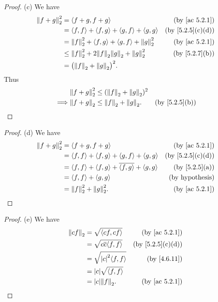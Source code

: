 \begin{proof}{(c)}
  We have
  \begin{align*}
    \norm*{f + g}_2^2 & = \inner*{f + g, f + g}                                         & \text{(by \cref{ac 5.2.1})}    \\
                      & = \inner*{f, f} + \inner*{f, g} + \inner*{g, f} + \inner*{g, g} & \text{(by \cref{5.2.5}(c)(d))} \\
                      & = \norm*{f}_2^2 + \inner*{f, g} + \inner*{g, f} + \norm*{g}_2^2 & \text{(by \cref{ac 5.2.1})}    \\
                      & \leq \norm*{f}_2^2 + 2 \norm*{f}_2 \norm*{g}_2 + \norm*{g}_2^2  & \text{(by \cref{5.2.7}(b))}    \\
                      & = \big(\norm*{f}_2 + \norm*{g}_2\big)^2.
  \end{align*}
  Thus
  \begin{align*}
             & \norm*{f + g}_2^2 \leq (\norm*{f}_2 + \norm*{g}_2)^2                               \\
    \implies & \norm*{f + g}_2 \leq \norm*{f}_2 + \norm*{g}_2.      & \text{(by \cref{5.2.5}(b))}
  \end{align*}
\end{proof}

\begin{proof}{(d)}
  We have
  \begin{align*}
    \norm*{f + g}_2^2 & = \inner*{f + g, f + g}                                                    & \text{(by \cref{ac 5.2.1})}    \\
                      & = \inner*{f, f} + \inner*{f, g} + \inner*{g, f} + \inner*{g, g}            & \text{(by \cref{5.2.5}(c)(d))} \\
                      & = \inner*{f, f} + \inner*{f, g} + \overline{\inner*{f, g}} + \inner*{g, g} & \text{(by \cref{5.2.5}(a))}    \\
                      & = \inner*{f, f} + \inner*{g, g}                                            & \text{(by hypothesis)}         \\
                      & = \norm*{f}_2^2 + \norm*{g}_2^2.                                           & \text{(by \cref{ac 5.2.1})}
  \end{align*}
\end{proof}

\begin{proof}{(e)}
  We have
  \begin{align*}
    \norm*{cf}_2 & = \sqrt{\inner*{cf, cf}}              & \text{(by \cref{ac 5.2.1})}    \\
                 & = \sqrt{c \overline{c} \inner*{f, f}} & \text{(by \cref{5.2.5}(c)(d))} \\
                 & = \sqrt{\abs{c}^2 \inner*{f, f}}      & \text{(by \cref{4.6.11})}      \\
                 & = \abs{c} \sqrt{\inner*{f, f}}                                         \\
                 & = \abs{c} \norm*{f}_2.                & \text{(by \cref{ac 5.2.1})}
  \end{align*}
\end{proof}

